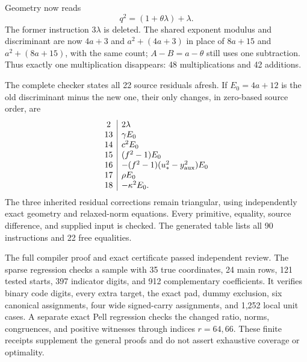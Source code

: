 Geometry now reads
\[
 q^2=(1+\theta\lambda)+\lambda.
\]
The former instruction $3\lambda$ is deleted. The shared exponent
modulus and discriminant are now $4a+3$ and $a^2+(4a+3)$ in place
of $8a+15$ and $a^2+(8a+15)$, with the same count; $A-B=a-\theta$
still uses one subtraction. Thus exactly one multiplication disappears:
48 multiplications and 42 additions.

The complete checker states all 22 source residuals afresh. If
$E_0=4a+12$ is the old discriminant minus the new one, their only
changes, in zero-based source order, are
\[
\begin{array}{c|l}
2&2\lambda\\
13&\gamma E_0\\
14&c^2E_0\\
15&(f^2-1)E_0\\
16&-(f^2-1)(u_*^2-y_{\rm aux}^2)E_0\\
17&\rho E_0\\
18&-\kappa^2E_0 .
\end{array}
\]
The three inherited residual corrections remain triangular, using
independently exact geometry and relaxed-norm equations. Every
primitive, equality, source difference, and supplied input is checked.
The generated table lists all 90 instructions and 22 free equalities.

The full compiler proof and exact certificate passed independent
review. The sparse regression checks a sample with 35 true coordinates,
24 main rows, 121 tested starts, 397 indicator digits, and 912
complementary coefficients. It verifies binary code digits, every
extra target, the exact pad, dummy exclusion, six canonical assignments,
four wide signed-carry assignments, and 1,252 local unit cases.
A separate exact Pell regression checks the changed ratio, norms,
congruences, and positive witnesses through indices $r=64,66$.
These finite receipts supplement the general proofs and do not assert
exhaustive coverage or optimality.
